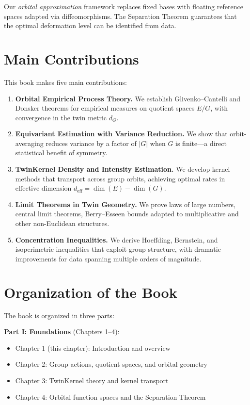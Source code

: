 \documentclass[11pt,twoside,openright]{book}
\theoremstyle{plain}
\theoremstyle{definition}
\theoremstyle{remark}
\newcommand{\deff}{d_{\mathrm{eff}}}
\begin{document}
Our \emph{orbital approximation} framework replaces fixed bases with floating reference spaces adapted via diffeomorphisms. The Separation Theorem guarantees that the optimal deformation level can be identified from data.

\section{Main Contributions}

This book makes five main contributions:

\begin{enumerate}
\item \textbf{Orbital Empirical Process Theory.} We establish Glivenko--Cantelli and Donsker theorems for empirical measures on quotient spaces $E/G$, with convergence in the twin metric $d_G$.

\item \textbf{Equivariant Estimation with Variance Reduction.} We show that orbit-averaging reduces variance by a factor of $|G|$ when $G$ is finite---a direct statistical benefit of symmetry.

\item \textbf{TwinKernel Density and Intensity Estimation.} We develop kernel methods that transport across group orbits, achieving optimal rates in effective dimension $\deff = \dim(E) - \dim(G)$.

\item \textbf{Limit Theorems in Twin Geometry.} We prove laws of large numbers, central limit theorems, Berry--Esseen bounds adapted to multiplicative and other non-Euclidean structures.

\item \textbf{Concentration Inequalities.} We derive Hoeffding, Bernstein, and isoperimetric inequalities that exploit group structure, with dramatic improvements for data spanning multiple orders of magnitude.
\end{enumerate}

\section{Organization of the Book}

The book is organized in three parts:

\textbf{Part I: Foundations} (Chapters 1--4):
\begin{itemize}
\item Chapter 1 (this chapter): Introduction and overview
\item Chapter 2: Group actions, quotient spaces, and orbital geometry
\item Chapter 3: TwinKernel theory and kernel transport
\item Chapter 4: Orbital function spaces and the Separation Theorem
\end{itemize}
\end{document}
